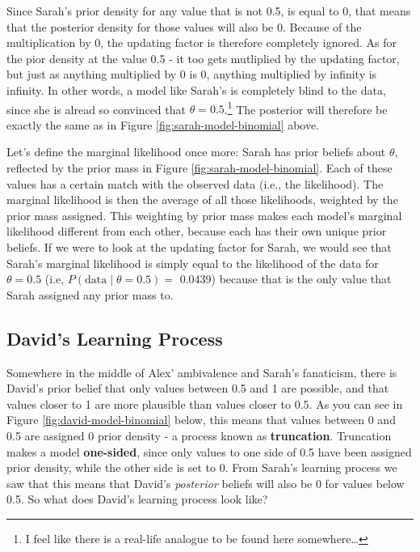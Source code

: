 \documentclass[
]{book}
\begin{document}
Since Sarah's prior density for any value that is not 0.5, is equal to 0, that means that the posterior density for those values will also be 0. Because of the multiplication by 0, the updating factor is therefore completely ignored. As for the pior density at the value 0.5 - it too gets mutliplied by the updating factor, but just as anything multiplied by 0 is 0, anything multiplied by infinity is infinity. In other words, a model like Sarah's is completely blind to the data, since she is alread so convinced that \(\theta = 0.5\).\footnote{I feel like there is a real-life analogue to be found here somewhere\ldots{}} The posterior will therefore be exactly the same as in Figure \ref{fig:sarah-model-binomial} above.

Let's define the marginal likelihood once more: Sarah has prior beliefs about \(\theta\), reflected by the prior mass in Figure \ref{fig:sarah-model-binomial}. Each of these values has a certain match with the observed data (i.e., the likelihood). The marginal likelihood is then the average of all those likelihoods, weighted by the prior mass assigned. This weighting by prior mass makes each model's marginal likelihood different from each other, because each has their own unique prior beliefs.
If we were to look at the updating factor for Sarah, we would see that Sarah's marginal likelihood is simply equal to the likelihood of the data for \(\theta = 0.5\) (i.e, \(P(\text{data} \mid \theta = 0.5) =\) 0.0439) because that is the only value that Sarah assigned any prior mass to.

\hypertarget{davids-learning-process}{%
\subsection{David's Learning Process}\label{davids-learning-process}}

Somewhere in the middle of Alex' ambivalence and Sarah's fanaticism, there is David's prior belief that only values between 0.5 and 1 are possible, and that values closer to 1 are more plausible than values closer to 0.5. As you can see in Figure \ref{fig:david-model-binomial} below, this means that values between 0 and 0.5 are assigned 0 prior density - a process known as \textbf{truncation}. Truncation makes a model \textbf{one-sided}, since only values to one side of 0.5 have been assigned prior density, while the other side is set to 0. From Sarah's learning process we saw that this means that David's \emph{posterior} beliefs will also be 0 for values below 0.5. So what does David's learning process look like?
\end{document}
